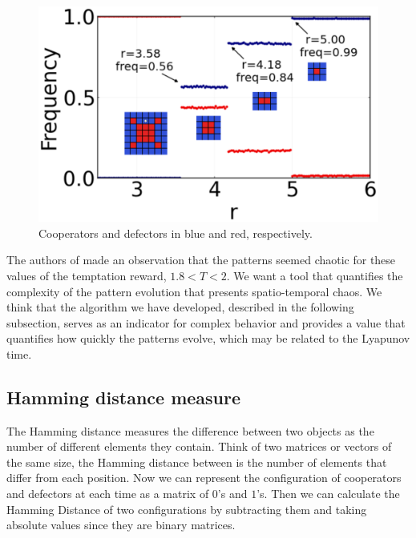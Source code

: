 \begin{figure}
    \centering
    \includegraphics[width=1\linewidth]{Images/P3/PGG_Proportion.eps}
    \caption{Cooperators and defectors in blue and red, respectively.}
    \label{fig:GranPlot}
\end{figure}

The authors of \cite{SpatialChaos} made an observation that the patterns seemed chaotic for these values of the temptation reward, $1.8 < T < 2$. We want a tool that quantifies the complexity of the pattern evolution that presents spatio-temporal chaos. We think that the algorithm we have developed, described in the following subsection, serves as an indicator for complex behavior and provides a value that quantifies how quickly the patterns evolve, which may be related to the Lyapunov time.



\subsection{Hamming distance measure}


The Hamming distance measures the difference between two objects as the number of different elements they contain. Think of two matrices or vectors of the same size, the Hamming distance between is the number of elements that differ from each position. Now we can represent the configuration of cooperators and defectors at each time as a matrix of $0$'s and $1$'s. Then we can calculate the Hamming Distance of two configurations by subtracting them and taking absolute values since they are binary matrices.

